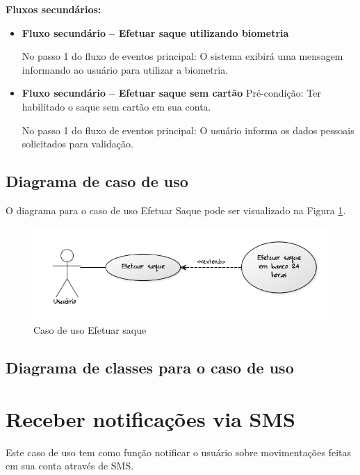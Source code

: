 \textbf{Fluxos secundários:}

\begin{itemize}
  \item \textbf{Fluxo secundário – Efetuar saque utilizando biometria}

  No passo 1 do fluxo de eventos principal:
  \subitem O sistema exibirá uma mensagem informando ao usuário para utilizar a biometria.

  \item \textbf{Fluxo secundário – Efetuar saque sem cartão}
  Pré-condição: Ter habilitado o saque sem cartão em sua conta.

  No passo 1 do fluxo de eventos principal:
  \subitem O usuário informa os dados pessoais solicitados para validação.

\end{itemize}

\subsection{Diagrama de caso de uso}

O diagrama para o caso de uso Efetuar Saque pode ser visualizado na Figura \ref{cdu:efetuarSaque}.

\begin{figure}[!htb]
     \centering
     \includegraphics[scale=0.6]{diagramas/caso-de-uso/imagens/efetuarSaque.png}
     \caption{Caso de uso Efetuar saque}
     \label{cdu:efetuarSaque}
\end{figure}

\subsection{Diagrama de classes para o caso de uso}

\section{Receber notificações via SMS}
\label{sec:ReceberSMS}

Este caso de uso tem como função notificar o usuário sobre movimentações feitas em sua conta através de SMS.

